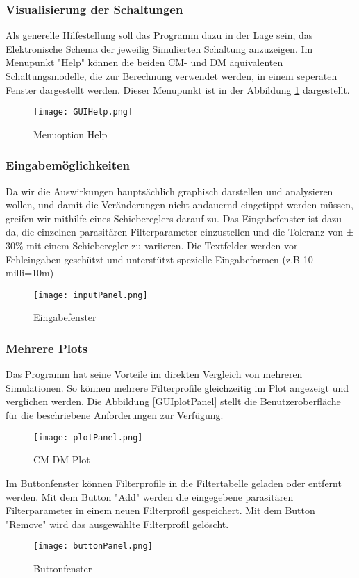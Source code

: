 \bigskip
\subsubsection{Visualisierung der Schaltungen} \label{subsubsec:visualisierungderschaltungen}
Als generelle Hilfestellung soll das Programm dazu in der Lage sein, das Elektronische Schema der jeweilig Simulierten Schaltung anzuzeigen.
Im Menupunkt "Help" können die beiden CM- und DM äquivalenten Schaltungsmodelle, die zur Berechnung verwendet werden, in einem seperaten Fenster dargestellt werden. Dieser Menupunkt ist in der Abbildung \ref{fig:GUIHelp}  dargestellt.

\begin{figure}[H]
	\centering
	\texttt{[image: GUIHelp.png]}
	\caption{Menuoption Help}
	\label{fig:GUIHelp}
\end{figure}
\bigskip

\subsubsection{Eingabemöglichkeiten}\label{subsubsec:eingabemöglichkeiten}
Da wir  die Auswirkungen hauptsächlich graphisch darstellen und analysieren wollen, und damit die Veränderungen nicht andauernd eingetippt werden müssen, greifen wir mithilfe eines Schiebereglers darauf zu. Das Eingabefenster ist dazu da, die einzelnen parasitären Filterparameter einzustellen und die Toleranz von ± 30\% mit einem Schieberegler zu variieren. Die Textfelder werden vor Fehleingaben geschützt und unterstützt spezielle Eingabeformen (z.B 10 milli=10m)
\begin{figure}[H]
	\centering
	\texttt{[image: inputPanel.png]}
	\caption{Eingabefenster}
	\label{fig:GUIinputPanel}
\end{figure}
\bigskip

\subsubsection{Mehrere Plots}\label{subsubsec:mehrereplots}
Das Programm hat seine Vorteile im direkten Vergleich von mehreren Simulationen. So können mehrere Filterprofile gleichzeitig im Plot angezeigt und verglichen werden. Die Abbildung \ref{GUIplotPanel} stellt die Benutzeroberfläche für die beschriebene Anforderungen zur Verfügung.
\begin{figure}[H]
	\centering
	\texttt{[image: plotPanel.png]}
	\caption{CM DM Plot}
	\label{fig:GUIplotPanel}
\end{figure}
Im Buttonfenster können Filterprofile in die Filtertabelle geladen oder entfernt werden. Mit dem Button "Add" werden die eingegebene parasitären Filterparameter in einem neuen Filterprofil gespeichert. Mit dem Button "Remove" wird das ausgewählte Filterprofil gelöscht.
\begin{figure}[H]
	\centering
	\texttt{[image: buttonPanel.png]}
	\caption{Buttonfenster}
	\label{fig:buttonPanel}
\end{figure}
\bigskip


